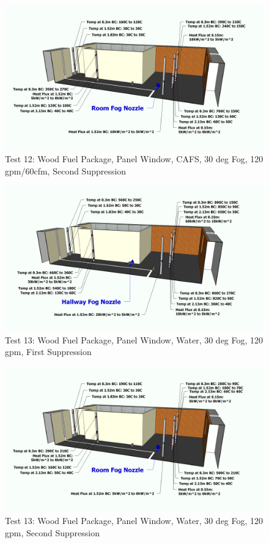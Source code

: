\documentclass[12pt,oneside]{book}
\begin{document}
\begin{figure}[!ht]
	\includegraphics[width=6in]{../Figures/Pictures/Metric/DelCoFogTest12SecondSuppression}
	\caption{Test 12: Wood Fuel Package, Panel Window, CAFS, 30 deg Fog, 120 gpm/60cfm, Second Suppression}
	\label{fig:Test_12_Second_Suppression}
\end{figure}

\clearpage

\begin{figure}[!ht]
	\includegraphics[width=6in]{../Figures/Pictures/Metric/DelCoFogTest13FirstSuppression}
	\caption{Test 13: Wood Fuel Package, Panel Window, Water, 30 deg Fog, 120 gpm, First Suppression}
	\label{fig:Test_13_First_Suppression}
\end{figure}

\begin{figure}[!ht]
	\includegraphics[width=6in]{../Figures/Pictures/Metric/DelCoFogTest13SecondSuppression}
	\caption{Test 13: Wood Fuel Package, Panel Window, Water, 30 deg Fog, 120 gpm, Second Suppression}
	\label{fig:Test_13_Second_Suppression}
\end{figure}
\end{document}

